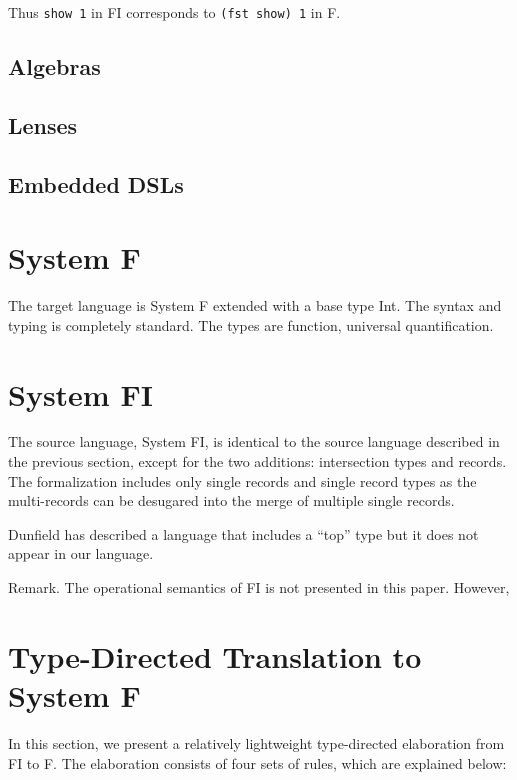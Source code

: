 \documentclass[preprint]{sigplanconf}
\begin{document}
Thus \texttt{show 1} in FI corresponds to \texttt{(fst show) 1} in F.

\subsection{Algebras}

\subsection{Lenses}

\subsection{Embedded DSLs}

\section{System F}

The target language is System F extended with a base type Int. The syntax and
typing is completely standard. The types are function, universal quantification.

\section{System FI}

The source language, System FI, is identical to the source language described in
the previous section, except for the two additions: intersection types and
records. The formalization includes only single records and single record types as the multi-records can be desugared into the merge of multiple single records.

Dunfield has described a language that includes a ``top'' type but it does not appear in our language.

Remark. The operational semantics of FI is not presented in this paper. However,

\section{Type-Directed Translation to System F}

In this section, we present a relatively lightweight type-directed elaboration
from FI to F. The elaboration consists of four sets of rules, which are
explained below:
\end{document}

